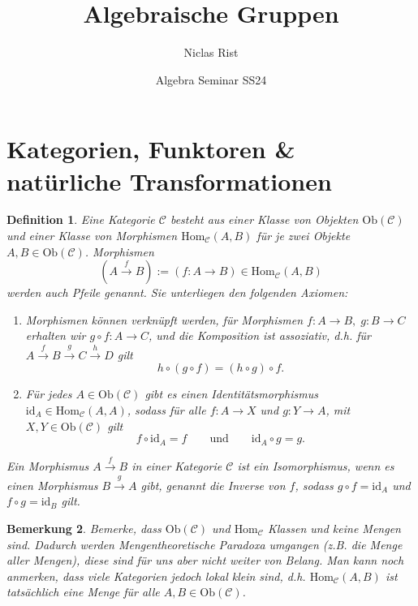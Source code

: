 \documentclass[a4paper, 11pt]{scrartcl}
\title{Algebraische Gruppen}
\author{Niclas Rist}
\date{Algebra Seminar SS24}
\newcommand{\Hom}{\text{Hom}}
\newcommand{\id}{\text{id}}
\newcommand{\Ob}{\text{Ob}}
\theoremstyle{basicstyle}
\newtheorem{definition}{Definition}[section]
\newtheorem{bemerkung}[definition]{Bemerkung}
\begin{document}
    \maketitle
    \onehalfspacing

    \section{Kategorien, Funktoren \& natürliche Transformationen}

    \begin{definition}
        Eine \emph{Kategorie} \(\mathcal{C}\) besteht aus einer Klasse von \emph{Objekten} \(\Ob(\mathcal{C})\) und einer Klasse von \emph{Morphismen} \(\Hom_{\mathcal{C}}(A, B)\) für je zwei Objekte \(A, B \in \Ob(\mathcal{C})\).
        Morphismen
        \[(A \overset{f}{\longrightarrow} B) := (f: A \longrightarrow B) \in \Hom_{\mathcal{C}}(A, B)\]
        werden auch \emph{Pfeile} genannt.
        Sie unterliegen den folgenden Axiomen:
        \begin{enumerate}
            \item Morphismen können \emph{verknüpft} werden, für Morphismen \(f: A \to B, \; g: B \to C\) erhalten wir \(g \circ f: A \to C\), und die Komposition ist assoziativ, d.h. für \(A \overset{f}{\longrightarrow} B \overset{g}{\longrightarrow} C \overset{h}{\longrightarrow} D\) gilt
                \[h \circ (g \circ f) = (h \circ g) \circ f.\]
            \item Für jedes \(A \in \Ob(\mathcal{C})\) gibt es einen \emph{Identitätsmorphismus} \(\id_A \in \Hom_{\mathcal{C}}(A, A)\), sodass für alle \(f: A \to X\) und \(g: Y \to A\), mit \(X, Y \in \Ob(\mathcal{C})\) gilt
                \[f \circ \id_A = f \qquad\text{und}\qquad \id_A \circ g = g.\]
        \end{enumerate}
        Ein Morphismus \(A \overset{f}{\longrightarrow} B\) in einer Kategorie \(\mathcal{C}\) ist ein \emph{Isomorphismus}, wenn es einen Morphismus \(B \overset{g}{\longrightarrow} A\) gibt, genannt die \emph{Inverse} von \(f\), sodass \(g \circ f = \id_A\) und \(f \circ g = \id_B\) gilt.
    \end{definition}

    \begin{bemerkung}
        Bemerke, dass \(\Ob(\mathcal{C})\) und \(\Hom_{\mathcal{C}}\) Klassen und keine Mengen sind.
        Dadurch werden Mengentheoretische Paradoxa umgangen (z.B. die Menge aller Mengen), diese sind für uns aber nicht weiter von Belang.
        Man kann noch anmerken, dass viele Kategorien jedoch \emph{lokal klein} sind, d.h. \(\Hom_{\mathcal{C}}(A, B)\) ist tatsächlich eine Menge für alle \(A, B \in \Ob(\mathcal{C})\).
    \end{bemerkung}
\end{document}
